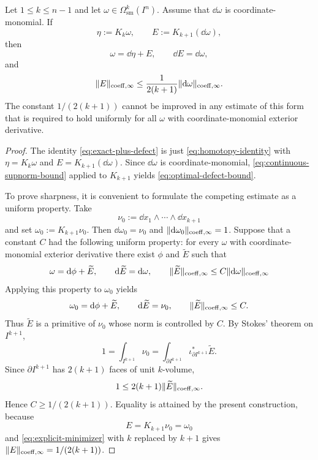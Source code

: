 \begin{proposition}
\label{thm:homotopy-decomposition}
Let $1\le k\le n-1$ and let $\omega\in\Omega^k_{\mathrm{sm}}(I^n)$. Assume
that $\dd\omega$ is coordinate-monomial. If
\[
\eta:=K_k\omega,
\qquad
E:=K_{k+1}(\dd\omega),
\]
then
\begin{equation}
\label{eq:exact-plus-defect}
\omega=\dd\eta+E,
\qquad
\dd E=\dd\omega,
\end{equation}
and
\begin{equation}
\label{eq:optimal-defect-bound}
\lVert E \rVert_{\mathrm{coeff},\infty}\le
\frac{1}{2(k+1)}\lVert \mathrm{d}\omega \rVert_{\mathrm{coeff},\infty}.
\end{equation}
The constant $1/(2(k+1))$ cannot be improved in any estimate of this form that
is required to hold uniformly for all $\omega$ with coordinate-monomial
exterior derivative.
\end{proposition}

\begin{proof}
The identity \eqref{eq:exact-plus-defect} is just
\eqref{eq:homotopy-identity} with $\eta=K_k\omega$ and
$E=K_{k+1}(\dd\omega)$. Since $\dd\omega$ is coordinate-monomial,
\eqref{eq:continuous-supnorm-bound} applied to $K_{k+1}$ yields
\eqref{eq:optimal-defect-bound}.

To prove sharpness, it is convenient to formulate the competing estimate as a
uniform property. Take
\[
\nu_0:=\dd x_1\wedge\cdots\wedge \dd x_{k+1}
\]
and set $\omega_0:=K_{k+1}\nu_0$. Then $\dd\omega_0=\nu_0$ and
$\lVert \mathrm{d}\omega_0 \rVert_{\mathrm{coeff},\infty}=1$. Suppose that a constant $C$ had the
following uniform property: for every $\omega$ with coordinate-monomial
exterior derivative there exist $\phi$ and $\widetilde E$ such that
\[
\omega=\mathrm{d}\phi+\widetilde E,
\qquad
\mathrm{d}\widetilde E=\mathrm{d}\omega,
\qquad
\lVert \widetilde E \rVert_{\mathrm{coeff},\infty}\le C\lVert \mathrm{d}\omega \rVert_{\mathrm{coeff},\infty}
\]
Applying this property to $\omega_0$ yields
\[
\omega_0=\mathrm{d}\phi+\widetilde E,
\qquad
\mathrm{d}\widetilde E=\nu_0,
\qquad
\lVert \widetilde E \rVert_{\mathrm{coeff},\infty}\le C.
\]
Thus $\widetilde E$ is a primitive of $\nu_0$ whose norm is controlled by $C$.
By Stokes' theorem on $I^{k+1}$,
\[
1
=
\int_{I^{k+1}}\nu_0
=
\int_{\partial I^{k+1}}\iota_{\partial I^{k+1}}^\ast\widetilde E.
\]
Since $\partial I^{k+1}$ has $2(k+1)$ faces of unit $k$-volume,
\[
1\le 2(k+1)\lVert \widetilde E \rVert_{\mathrm{coeff},\infty}.
\]
Hence $C\ge 1/(2(k+1))$. Equality is attained by the present construction,
because
\[
E=K_{k+1}\nu_0=\omega_0
\]
and \eqref{eq:explicit-minimizer} with $k$ replaced by $k+1$ gives
$\lVert E \rVert_{\mathrm{coeff},\infty}=1/(2(k+1))$.
\end{proof}

